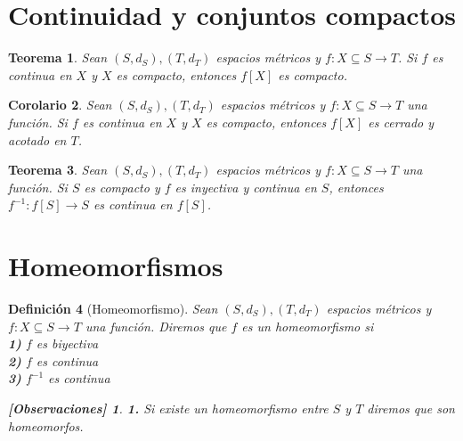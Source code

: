 \documentclass[oneside]{book} %
\theoremstyle{Teorema}
\newtheorem{Definicion}{Definición}[chapter]
\newtheorem{Teorema}[Definicion]{Teorema}
\newtheorem{Corolario}[Definicion]{Corolario}
\theoremstyle{Ejemplos}
\theoremstyle{[Obs]}
\newtheorem*{Obs}{[Observaciones]}
\renewcommand{\{}{\left\lbrace} %
\renewcommand{\}}{\right\rbrace} %
\renewcommand{\sc}{\subseteq} %
\begin{document}
		\section{Continuidad y conjuntos compactos}

			\begin{Teorema}
				
				Sean $(S, d_S), (T, d_T)$ espacios métricos y $f : X \sc S \to T$. Si $f$ es continua en $X$ y $X$ es compacto, entonces $f[X]$ es compacto. \\

			\end{Teorema}

			\begin{Corolario}
				
				Sean $(S, d_S), (T, d_T)$ espacios métricos y $f : X \sc S \to T$ una función. Si $f$ es continua en $X$ y $X$ es compacto, entonces $f[X]$ es cerrado y acotado en $T$. \\

			\end{Corolario}

			\begin{Teorema}
				
				Sean $(S, d_S), (T, d_T)$ espacios métricos y $f : X \sc S \to T$ una función. Si $S$ es compacto y $f$ es inyectiva y continua en $S$, entonces $f^{-1} : f[S] \to S$ es continua en $f[S]$. \\

			\end{Teorema}
		
		\section{Homeomorfismos}

			\begin{Definicion}[Homeomorfismo]

				Sean $(S, d_S), (T, d_T)$ espacios métricos y $f : X \sc S \to T$ una función. Diremos que $f$ es un homeomorfismo si \\

				\textbf{1)} $f$ es biyectiva \\

				\textbf{2)} $f$ es continua \\

				\textbf{3)} $f^{-1}$ es continua \\

				\begin{Obs}
				
					\hfill
				
					\textbf{1.} Si existe un homeomorfismo entre $S$ y $T$ diremos que son homeomorfos. \\
				
				\end{Obs}

			\end{Definicion}
\end{document}
